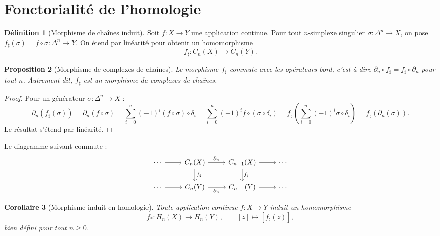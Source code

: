 \documentclass[12pt,a4paper,openany]{book}
\theoremstyle{definition}
\newtheorem{definition}{Définition}[chapter]
\theoremstyle{plain}
\newtheorem{proposition}[definition]{Proposition}
\newtheorem{corollaire}[definition]{Corollaire}
\theoremstyle{remark}
\begin{document}
\section{Fonctorialité de l'homologie}\label{sec:fonctorialite}

\begin{definition}[Morphisme de chaînes induit]\label{def:morphisme-chaines-induit}
Soit $f \colon X \to Y$ une application continue. Pour tout $n$-simplexe singulier
$\sigma \colon \Delta^n \to X$, on pose $f_\sharp(\sigma) = f \circ \sigma \colon \Delta^n \to Y$.
On étend par linéarité pour obtenir un homomorphisme
\[
  f_\sharp \colon C_n(X) \longrightarrow C_n(Y).
\]
\end{definition}

\begin{proposition}[Morphisme de complexes de chaînes]\label{prop:morphisme-complexes}
Le morphisme $f_\sharp$ commute avec les opérateurs bord, c'est-à-dire
$\partial_n \circ f_\sharp = f_\sharp \circ \partial_n$ pour tout $n$. Autrement dit, $f_\sharp$
est un \emph{morphisme de complexes de chaînes}.
\end{proposition}

\begin{proof}
Pour un générateur $\sigma \colon \Delta^n \to X$ :
\[
  \partial_n(f_\sharp(\sigma)) = \partial_n(f \circ \sigma) = \sum_{i=0}^{n} (-1)^i (f \circ \sigma) \circ \delta_i
  = \sum_{i=0}^{n} (-1)^i f \circ (\sigma \circ \delta_i) = f_\sharp\!\left(\sum_{i=0}^{n} (-1)^i \sigma \circ \delta_i\right)
  = f_\sharp(\partial_n(\sigma)).
\]
Le résultat s'étend par linéarité.
\end{proof}

Le diagramme suivant commute :
\[
\begin{tikzcd}
  \cdots \ar[r] & C_n(X) \ar[r, "\partial_n"] \ar[d, "f_\sharp"] & C_{n-1}(X) \ar[r] \ar[d, "f_\sharp"] & \cdots \\
  \cdots \ar[r] & C_n(Y) \ar[r, "\partial_n"'] & C_{n-1}(Y) \ar[r] & \cdots
\end{tikzcd}
\]

\begin{corollaire}[Morphisme induit en homologie]\label{cor:morphisme-induit-homologie}
Toute application continue $f \colon X \to Y$ induit un homomorphisme
\[
  f_* \colon H_n(X) \longrightarrow H_n(Y), \qquad [z] \longmapsto [f_\sharp(z)],
\]
bien défini pour tout $n \geq 0$.
\end{corollaire}
\end{document}
